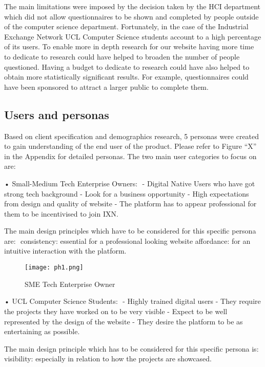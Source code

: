 \documentclass[fontsize=10pt]{extarticle}
\numberwithin{figure}{section} %
\begin{document}
The main limitations were imposed by the decision taken by the HCI
department which did not allow questionnaires to be shown and completed
by people outside of the computer science department. Fortunately, in
the case of the Industrial Exchange Network UCL Computer Science
students account to a high percentage of its users. To enable more in
depth research for our website having more time to dedicate to research
could have helped to broaden the number of people questioned. Having a
budget to dedicate to research could have also helped to obtain more
statistically significant results. For example, questionnaires could
have been sponsored to attract a larger public to complete them.

\hypertarget{users-and-personas}{%
\subsection{Users and personas}\label{users-and-personas}}

Based on client specification and demographics research, 5 personas were
created to gain understanding of the end user of the product. Please
refer to Figure ``X'' in the Appendix for detailed personas. The two
main user categories to focus on are: ​

• Small-Medium Tech Enterprise Owners: ​ - Digital Native Users who have
got strong tech background​ - Look for a business opportunity​ - High
expectations from design and quality of website​ - The platform has to
appear professional for them to be incentivised to join IXN​.

The main design principles which have to be considered for this specific
persona are: ​ consistency: essential for a professional looking
website​ affordance: for an intuitive interaction with the platform. ​

\begin{figure}[H]
      \centering
      \texttt{[image: ph1.png]}
      \caption{SME Tech Enterprise Owner}
\end{figure}

• UCL Computer Science Students: ​ - Highly trained digital users​ -
They require the projects they have worked on to be very visible​ -
Expect to be well represented by the design of the website​ - They
desire the platform to be as entertaining as possible. ​

The main design principle which has to be considered for this specific
persona is: ​ visibility: especially in relation to how the projects are
showcased. ​
\end{document}
